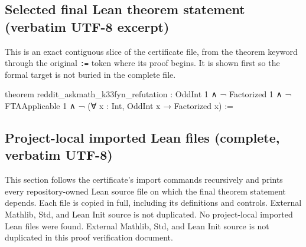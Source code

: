 \documentclass[11pt]{article}
\begin{document}
\subsection*{Selected final Lean theorem statement (verbatim UTF-8 excerpt)}
This is an exact contiguous slice of the certificate file, from the theorem keyword through the original \texttt{:=} token where its proof begins. It is shown first so the formal target is not buried in the complete file.
\begin{Vlean}
theorem reddit_askmath_k33fyn_refutation :
    OddInt 1 ∧
    ¬ Factorized 1 ∧
    ¬ FTAApplicable 1 ∧
    ¬ (∀ x : Int, OddInt x → Factorized x) :=
\end{Vlean}
\subsection*{Project-local imported Lean files (complete, verbatim UTF-8)}
This section follows the certificate's import commands recursively and prints every repository-owned Lean source file on which the final theorem statement depends. Each file is copied in full, including its definitions and controls. External Mathlib, Std, and Lean Init source is not duplicated.
No project-local imported Lean files were found. External Mathlib, Std, and Lean Init source is not duplicated in this proof verification document.
\end{document}
